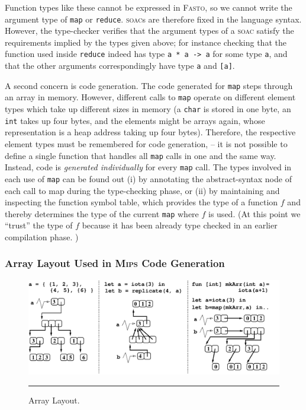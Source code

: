 \documentclass[a4paper,11pt]{article}
\newcommand{\fasto}{\textsc{Fasto}\xspace}
\newcommand{\mips}{\textsc{Mips}\xspace}
\begin{document}
Function types like these cannot be expressed in \fasto, so we cannot 
write the argument type of \texttt{map} or \texttt{reduce}.
\textsc{soac}s are therefore fixed in the language syntax.
%
However, the type-checker verifies that the argument types of a \textsc{soac}
satisfy the requirements implied by the types given above; for instance
checking that the function used inside \texttt{reduce} indeed has type
\texttt{a * a -> a} for some type \texttt{a}, and that the other arguments
correspondingly have type \texttt{a} and \texttt{[a]}.

A second concern is code generation. The code generated for 
\texttt{map} steps through an array in memory. 
However, different calls to \texttt{map} operate on different element types
which take up different sizes in memory 
(a \texttt{char} is stored in one byte, an \texttt{int} takes up four bytes,
and the elements might be arrays again, whose representation is a heap address 
taking up four bytes).
Therefore, the respective element types must be remembered 
for code generation, -- it is not possible to define a single function
that handles all \texttt{map} calls in one and the same way.
Instead, code is {\em generated individually} for every {\tt map} call. 
%
The types involved in each use of {\tt map}
can be found out (i) by annotating the abstract-syntax node of each call to map
during the type-checking phase, or (ii) by maintaining and inspecting the function
symbol table, which provides the type of a function $f$ and thereby determines the 
type of the current {\tt map} where $f$ is used.   
%
(At this point we ``trust'' the type of $f$ because
it has been already type checked in an earlier compilation phase. )

\subsubsection{Array Layout Used in \mips Code Generation}

\begin{figure}[t]%
\includegraphics[scale=0.33]{Figures/Arrays}
\hrule
\vspace*{-1ex}
\caption{Array Layout.}
\label{fig:ArrLayout1} %
\vspace*{-1ex}
\end{figure}
\end{document}
